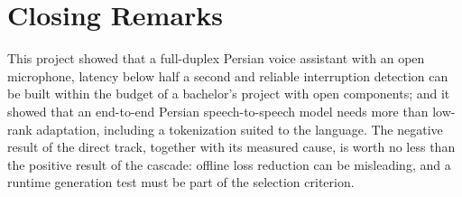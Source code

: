 \section{Closing Remarks}
\label{sec:closing}

This project showed that a full-duplex Persian voice assistant with an open microphone, latency below
half a second and reliable interruption detection can be built within the budget of a bachelor's
project with open components; and it showed that an end-to-end Persian speech-to-speech model needs
more than low-rank adaptation, including a tokenization suited to the language. The negative result
of the direct track, together with its measured cause, is worth no less than the positive result of
the cascade: offline loss reduction can be misleading, and a runtime generation test must be part of
the selection criterion.
